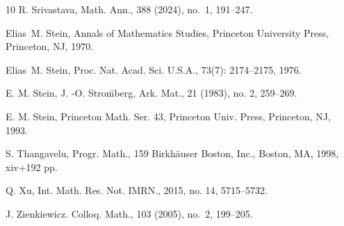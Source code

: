 \documentclass[11pt]{amsart}
\theoremstyle{definition}
\numberwithin{equation}{section}
\begin{document}
\begin{thebibliography}{10}
R. Srivastava,  Math. Ann., 388 (2024), no.~1, 191--247.

Elias~M. Stein,
 Annals of Mathematics Studies, Princeton University Press, Princeton, NJ, 1970.

Elias~M. Stein,
 Proc. Nat. Acad. Sci. U.S.A., 73(7): 2174--2175, 1976.

E. M. Stein, J. -O. Stro\"mberg,  Ark. Mat., 21 (1983), no. 2, 259--269.

E. M. Stein,  Princeton Math. Ser. 43,
Princeton Univ. Press, Princeton, NJ, 1993.
 
S. Thangavelu,  Progr. Math., 159
Birkh{\"a}user Boston, Inc., Boston, MA, 1998, xiv+192 pp.

Q. Xu,   Int. Math. Res. Not. IMRN., 2015, no. 14, 5715--5732.

J. Zienkiewicz.    Colloq. Math., 103 (2005), no.~2, 199--205.
\end{thebibliography}
\end{document}

